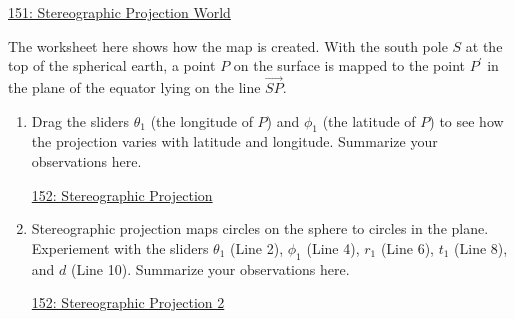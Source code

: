 \documentclass{ximera}
\begin{document}
\href{https://www.desmos.com/calculator/wy9zoftmbe}{151: Stereographic Projection World}


The worksheet here shows how the map is created. With the south pole $S$ at the top of the spherical earth, a point $P$ on the surface is mapped to the point $P^\prime$ in the plane of the equator lying on the line $\overrightarrow{SP}$. 

\begin{enumerate}
\item Drag the sliders $\theta_1$ (the longitude of $P$) and $\phi_1$ (the latitude of $P$) to see how the projection varies with latitude and longitude. Summarize your observations here.
\begin{freeResponse}
\end{freeResponse}

\begin{onlineOnly}
    \begin{center}
\end{center}
\end{onlineOnly}

\href{https://www.desmos.com/3d/lnhm28tzak}{152: Stereographic Projection}


\item Stereographic projection maps circles on the sphere to circles in the plane. Experiement with the sliders $\theta_1$ (Line 2), $\phi_1$ (Line 4), $r_1$ (Line 6), $t_1$ (Line 8), and $d$ (Line 10). Summarize your observations here.
\begin{freeResponse}
\end{freeResponse}

\begin{onlineOnly}
    \begin{center}
\end{center}
\end{onlineOnly}

\href{https://www.desmos.com/3d/dukkzdikzg}{152: Stereographic Projection 2}

\end{enumerate}
\end{document}
